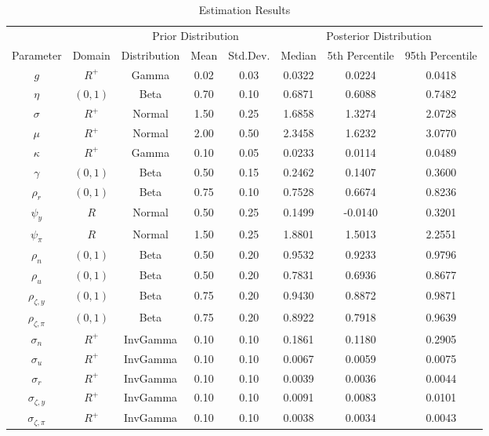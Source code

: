 \documentclass[12pt]{article}
\begin{document}
{\begin{table}
\centering
\caption{Estimation Results}\label{tb:parmsest}
\begin{center}
\begin{tabular}{c|c||c|cc||c|cc} \hline
\multicolumn{2}{c}{} & \multicolumn{3}{c}{Prior Distribution} & \multicolumn{3}{c}{Posterior Distribution} \\ 
Parameter & Domain & Distribution & Mean & Std.Dev. & Median & 5th Percentile & 95th Percentile \\ \hline 
$g$ & $R^{+}$ & Gamma & 0.02 & 0.03 & 0.0322 & 0.0224 & 0.0418 \\ 
$\eta$ & $(0,1)$ & Beta & 0.70 & 0.10 & 0.6871 & 0.6088 & 0.7482 \\ 
$\sigma$ & $R^{+}$ & Normal & 1.50 & 0.25 & 1.6858 & 1.3274 & 2.0728 \\ 
$\mu$ & $R^{+}$ & Normal & 2.00 & 0.50 & 2.3458 & 1.6232 & 3.0770 \\ 
$\kappa$ & $R^{+}$ & Gamma & 0.10 & 0.05 & 0.0233 & 0.0114 & 0.0489 \\ 
$\gamma$ & $(0,1)$ & Beta & 0.50 & 0.15 & 0.2462 & 0.1407 & 0.3600 \\ 
$\rho_r$ & $(0,1)$ & Beta & 0.75 & 0.10 & 0.7528 & 0.6674 & 0.8236 \\ 
$\psi_y$ & $R$ & Normal & 0.50 & 0.25 & 0.1499 & -0.0140 & 0.3201 \\ 
$\psi_{\pi}$ & $R$ & Normal & 1.50 & 0.25 & 1.8801 & 1.5013 & 2.2551 \\ 
$\rho_n$ & $(0,1)$ & Beta & 0.50 & 0.20 & 0.9532 & 0.9233 & 0.9796 \\ 
$\rho_u$ & $(0,1)$ & Beta & 0.50 & 0.20 & 0.7831 & 0.6936 & 0.8677 \\ 
$\rho_{\zeta,y}$ & $(0,1)$ & Beta & 0.75 & 0.20 & 0.9430 & 0.8872 & 0.9871 \\ 
$\rho_{\zeta,\pi}$ & $(0,1)$ & Beta & 0.75 & 0.20 & 0.8922 & 0.7918 & 0.9639 \\ 
$\sigma_{n}$ & $R^{+}$ & InvGamma & 0.10 & 0.10 & 0.1861 & 0.1180 & 0.2905 \\ 
$\sigma_{u}$ & $R^{+}$ & InvGamma & 0.10 & 0.10 & 0.0067 & 0.0059 & 0.0075 \\ 
$\sigma_{r}$ & $R^{+}$ & InvGamma & 0.10 & 0.10 & 0.0039 & 0.0036 & 0.0044 \\ 
$\sigma_{\zeta,y}$ & $R^{+}$ & InvGamma & 0.10 & 0.10 & 0.0091 & 0.0083 & 0.0101 \\ 
$\sigma_{\zeta,\pi}$ & $R^{+}$ & InvGamma & 0.10 & 0.10 & 0.0038 & 0.0034 & 0.0043 \\ 

\end{tabular}
\end{center}
\end{table}}
\end{document}
